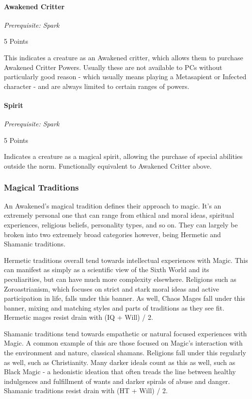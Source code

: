 \begin{multicols*}{3}
	\paragraph{Awakened Critter}\label{awakened_critter}
	\textit{Prerequisite: Spark}
	\begin{flushright}
		5 Points
	\end{flushright}
	
	This indicates a creature as an Awakened critter, which allows them to purchase Awakened Critter Powers. Usually these are not available to PCs without particularly good reason - which usually means playing a Metasapient or Infected character - and are always limited to certain ranges of powers.
	
	\paragraph{Spirit}
	\textit{Prerequisite: Spark}
	\begin{flushright}
		5 Points
	\end{flushright}
	
	Indicates a creature as a magical spirit, allowing the purchase of special abilities outside the norm. Functionally equivalent to Awakened Critter above.
	
	\subsubsection{Magical Traditions}
	
	An Awakened's magical tradition defines their approach to magic. It's an extremely personal one that can range from ethical and moral ideas, spiritual experiences, religious beliefs, personality types, and so on. They can largely be broken into two extremely broad categories however, being Hermetic and Shamanic traditions.
	
	Hermetic traditions overall tend towards intellectual experiences with Magic. This can manifest as simply as a scientific view of the Sixth World and its peculiarities, but can have much more complexity elsewhere. Religions such as Zoroastrianism, which focuses on strict and stark moral ideas and active participation in life, falls under this banner. As well, Chaos Mages fall under this banner, mixing and matching styles and parts of traditions as they see fit. Hermetic mages resist drain with (IQ + Will) / 2.
	
	Shamanic traditions tend towards empathetic or natural focused experiences with Magic. A common example of this are those focused on Magic's interaction with the environment and nature, classical shamans. Religions fall under this regularly as well, such as Christianity. Many darker ideals count as this as well, such as Black Magic - a hedonistic ideation that often treads the line between healthy indulgences and fulfillment of wants and darker spirals of abuse and danger. Shamanic traditions resist drain with (HT + Will) / 2.
	

\end{multicols*}
